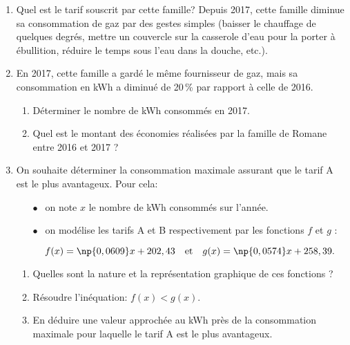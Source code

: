 \begin{enumerate}
\item Quel est le tarif souscrit par cette famille?
Depuis 2017, cette famille diminue sa consommation de gaz par des gestes simples (baisser le chauffage de quelques degrés, mettre un couvercle sur la casserole d'eau pour la porter à ébullition, réduire le temps sous l'eau dans la douche, etc.).
\item En 2017, cette famille a gardé le même fournisseur de gaz, mais sa consommation en kWh a diminué de 20\,\% par rapport à celle de 2016.
	\begin{enumerate}
		\item Déterminer le nombre de kWh consommés en 2017.
		\item Quel est le montant des économies réalisées par la famille de Romane entre 2016 et 2017 ?
	\end{enumerate}
\item On souhaite déterminer la consommation maximale assurant que le tarif A est le plus
avantageux. Pour cela:

\setlength\parindent{9mm}
\begin{itemize}
\item[$\bullet~~$] on note $x$ le nombre de kWh consommés sur l'année.
\item[$\bullet~~$] on modélise les tarifs A et B respectivement par les fonctions $f$ et $g$ :

\[f(x) = \np{0,0609}x + 202,43 \quad \text{et}\quad  g(x) = \np{0,0574}x + 258,39.\]
\end{itemize}
\setlength\parindent{0mm}

	\begin{enumerate}
		\item Quelles sont la nature et la représentation graphique de ces fonctions ?
		\item Résoudre l'inéquation: $f(x) < g(x)$.
		\item En déduire une valeur approchée au kWh près de la consommation maximale pour
laquelle le tarif A est le plus avantageux.
	\end{enumerate}
\end{enumerate}

\vspace{0.5cm}

